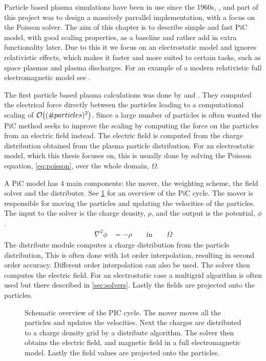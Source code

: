 
    Particle based plasma simulations have been in use since the 1960s, \citep{verboncoeur_particle_2005},
    and part of this project was to design a massively parrallel implementation,
    with a focus on the Poisson solver.
    The aim of this chapter is to describe simple and fast PiC model, with good scaling properties, as a baseline
    and rather add in extra functionality later. Due to this it we focus on an electrostatic model and
    ignores relativistic effects, which makes it faster and more suited to certain tasks, such as
	space plasmas and plasma discharges.
    For an example of a modern relativistic full electromagnetic model see
    \citet{sgattoni_piccante:_2015}.

    The first particle based plasma calculations was
    done by \citet{dawson_one-dimensional_1962} and \citet{buneman_dissipation_1959}.
    They computed the electrical force directly between the particles leading
    to a computational scaling of \(\order{(\#particles)^2}\).
    Since a large number of particles is often wanted the PiC method seeks to improve
    the scaling by computing the force on the particles from an electric field instead.
    The electric field is computed from the charge distribution obtained from the plasma particle
	distribution. For an electrostatic model, which this thesis focuses on, this is usually done by solving the Poisson
    equation, \cref{eq:poisson}, over the whole domain, \(\Omega\).

	A PiC model has \(4\) main components: the mover, the weighting scheme, the field solver
	and the distributer. See \cref{fig:schematic} for an overview of the PiC cycle.
	The mover is responsible for moving the particles and updating the velocities of the particles.
    The input to the solver is the charge density, \(\rho\), and the output is the potential, \(\phi\).
    \begin{align}
        \nabla ^2 \phi &= -\rho \qquad \text{in} \qquad \Omega \label{eq:poisson}
    \end{align}
    The distribute module computes a charge distribution from the particle distribution,
	This is often done with \(1\)st order interpolation, resulting in second order accuracy. Different order
	interpolation can also be used.
    The solver then computes the electric field. For an electrostatic case a multigrid algorithm is
	often used but there described in \cref{sec:solvers}.
    Lastly the fields are projected onto the particles.

    \begin{figure}
        \center
        
        \caption{Schematic overview of the PIC cycle. The mover moves all the particles and updates the velocities.
        Next the charges are distributed to a charge density grid by a distribute algorithm. The solver then
        obtains the electric field, and magnetic field in a full electromagnetic model. Lastly the field values are
		projected onto the particles.}
        \label{fig:schematic}
    \end{figure}

